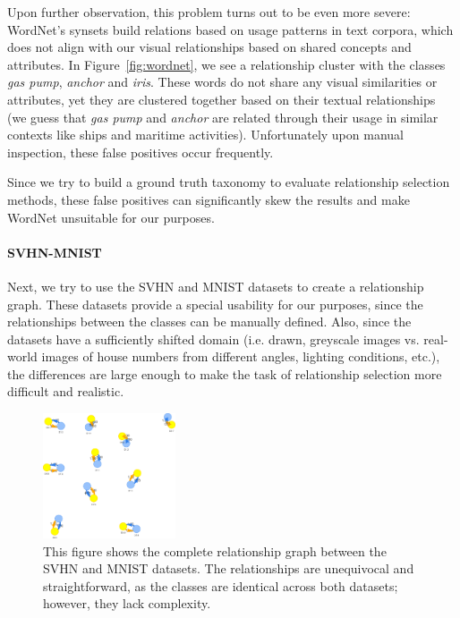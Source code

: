 Upon further observation, this problem turns out to be even more severe:
WordNet's synsets build relations based on usage patterns in text corpora,
which does not align with our visual relationships based on shared concepts and attributes.
In Figure~\ref{fig:wordnet}, we see a relationship cluster with the classes \textit{gas pump}, \textit{anchor} and \textit{iris}.
These words do not share any visual similarities or attributes, yet they are clustered together based on their textual relationships
(we guess that \textit{gas pump} and \textit{anchor} are related through their usage in similar contexts like ships and maritime activities).
Unfortunately upon manual inspection, these false positives occur frequently.

Since we try to build a ground truth taxonomy to evaluate relationship selection methods,
these false positives can significantly skew the results and make WordNet unsuitable for our purposes.

\paragraph{SVHN-MNIST}

Next, we try to use the SVHN and MNIST datasets to create a relationship graph.
These datasets provide a special usability for our purposes,
since the relationships between the classes can be manually defined.
Also, since the datasets have a sufficiently shifted domain (i.e. drawn, greyscale images vs. real-world images of house numbers
from different angles, lighting conditions, etc.),
the differences are large enough to make the task of relationship selection more difficult and realistic.

\begin{figure}[ht]
      \centering
      \includegraphics[width=0.35\textwidth]{figures/svhn_mnist.png}

      \caption{This figure shows the complete relationship graph between the SVHN and MNIST datasets.
            The relationships are unequivocal and straightforward, as the classes are identical across both datasets;
            however, they lack complexity.}
      \label{fig:svhn_mnist}
\end{figure}

